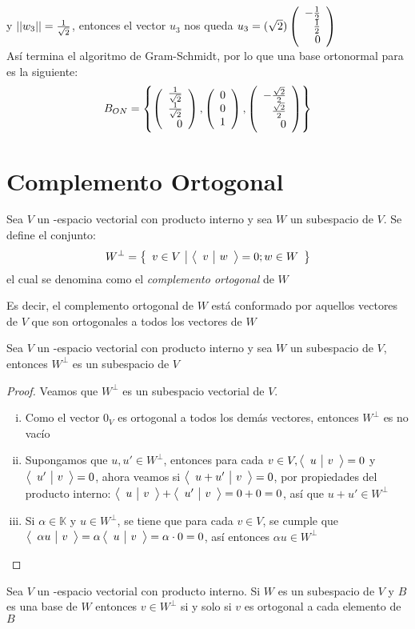 \begin{sol}
y $\left|\left| w_3 \right|\right| = \frac{1}{\sqrt{2}}$, entonces el vector $u_3$ nos queda $u_3 =(\sqrt{2}) \left( \begin{array}{r} -\frac{1}{2}\\ \frac{1}{2}\\ 0 \end{array} \right) $\\

Así termina el algoritmo de Gram-Schmidt, por lo que una base ortonormal para \rtres es la siguiente:
$$B_{ON} =  \left\{\left( \begin{array}{r} \frac{1}{\sqrt{2}}\\ \frac{1}{\sqrt{2}}\\ 0 \end{array} \right)  , \left( \begin{array}{r} 0\\ 0\\ 1 \end{array} \right) , \left( \begin{array}{r} -\frac{\sqrt{2}}{2}\\ \frac{\sqrt{2}}{2}\\ 0 \end{array} \right)  \right\} $$
\end{sol}

\section{Complemento Ortogonal}
\begin{dfn}
Sea $V$ un \dobleK-espacio vectorial con producto interno y sea $W$ un subespacio de $V$. Se define el conjunto:
$$W^\perp= \left\{\begin{array}{c|c} {v \in V }&{\left\langle \begin{array}{c|c} v & w \end{array}\right\rangle = 0 ; w \in W} \end{array} \right\}$$
el cual se denomina como el \textit{complemento ortogonal} de $W$
\end{dfn}
Es decir, el complemento ortogonal de $W$ está conformado por aquellos vectores de $V$ que son ortogonales a todos los vectores de $W$

\begin{theorem}
    Sea $V$ un \dobleK-espacio vectorial con producto interno y sea $W$ un subespacio de $V$, entonces $W^\perp$ es un subespacio de $V$
\end{theorem}
\begin{proof}
Veamos que $W^\perp$ es un subespacio vectorial de $V$.
\begin{enumerate}[i.]
\item Como el vector $0_V$ es ortogonal a todos los demás vectores, entonces $W^\perp$ es no vacío
\item Supongamos que $u , u' \in W^\perp$, entonces para cada $v \in V, \left\langle \begin{array}{c|c} u & v \end{array}\right\rangle = 0$ y $\left\langle \begin{array}{c|c} u' & v \end{array}\right\rangle = 0$, ahora veamos si $\left\langle \begin{array}{c|c} u + u' & v \end{array}\right\rangle = 0$, por propiedades del producto interno: $\left\langle \begin{array}{c|c} u & v \end{array}\right\rangle + \left\langle \begin{array}{c|c} u' & v \end{array}\right\rangle = 0+ 0 =0$, así que $u+u' \in W^\perp$
\item Si $\alpha \in \mathbb{K}$ y $u \in W^\perp$, se tiene que para cada $v \in V$, se cumple que $\left\langle \begin{array}{c|c} \alpha u & v \end{array}\right\rangle = \alpha \left\langle \begin{array}{c|c} u & v \end{array}\right\rangle = \alpha \cdot 0 = 0$, así entonces $\alpha u \in W^\perp$ 
\end{enumerate}
\end{proof}

\begin{theorem}
    Sea $V$ un \dobleK-espacio vectorial con producto interno. Si $W$ es un subespacio de $V$ y $B$ es una base de $W$ entonces $v \in W^\perp$ si y solo si $v$ es ortogonal a cada elemento de $B$
\end{theorem}

